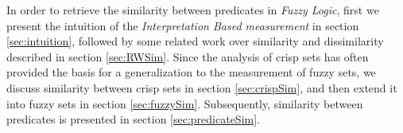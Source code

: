 In order to retrieve the similarity between predicates in \textit{Fuzzy Logic}, first we present the intuition of the 
\textit{Interpretation Based measurement} in section \ref{sec:intuition}, followed by  some related work over similarity and dissimilarity described in section \ref{sec:RWSim}. Since the analysis of crisp sets has often provided the basis for a generalization to the measurement of fuzzy sets, we discuss similarity between crisp sets in section \ref{sec:crispSim}, and then extend it into fuzzy sets in section \ref{sec:fuzzySim}.  Subsequently, %
similarity between predicates is presented in section \ref{sec:predicateSim}.  